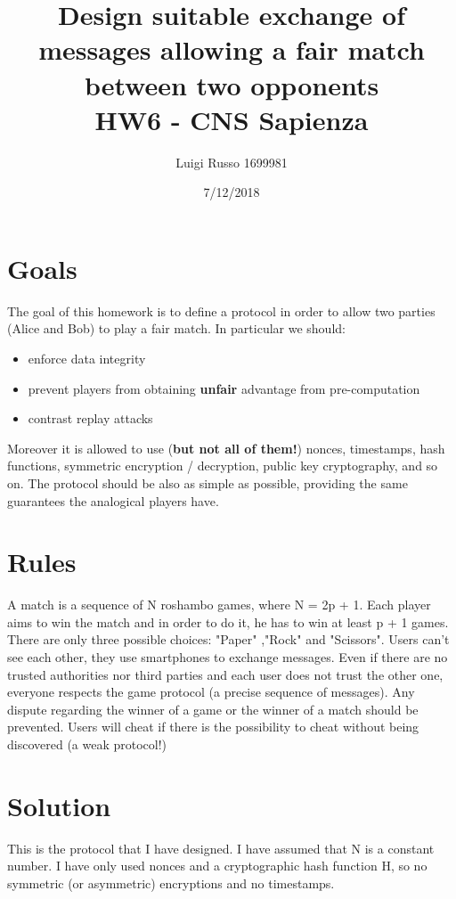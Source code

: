 \documentclass[11 pt]{article}
\title{
	Design suitable exchange of messages allowing a fair match between two opponents \\
	\large HW6 - CNS Sapienza}
\author{Luigi Russo 1699981}
\date{7/12/2018}
\begin{document}
\maketitle

\section{Goals}
The goal of this homework is to define a protocol in order to allow two parties (Alice and Bob) to play a fair match. In particular we should:
\begin{itemize}
	\item enforce data integrity
	\item prevent players from obtaining \textbf{unfair} advantage from pre-computation
	\item contrast replay attacks
\end{itemize}
Moreover it is allowed to use (\textbf{but not all of them!}) nonces, timestamps, hash functions, symmetric encryption / decryption, public key cryptography, and so on.
The protocol should be also as simple as possible, providing the same guarantees the analogical players have.

\section{Rules}
A match is a sequence of N roshambo games, where N = 2p + 1. Each player aims to win the match and in order to do it, he has to win at least p + 1 games. There are only three possible choices: "Paper" ,"Rock" and "Scissors". Users can't see each other, they use smartphones to exchange messages. Even if there are no trusted authorities nor third parties and each user does not trust the other one, everyone respects the game protocol (a precise sequence of messages). Any dispute regarding the winner of a game or the winner of a match should be prevented. Users will cheat if there is the possibility to cheat without being discovered (a weak protocol!)

\section{Solution}
This is the protocol that I have designed. I have assumed that N is a constant number. I have only used nonces and a cryptographic hash function H, so no symmetric (or asymmetric) encryptions and no timestamps.
\end{document}
